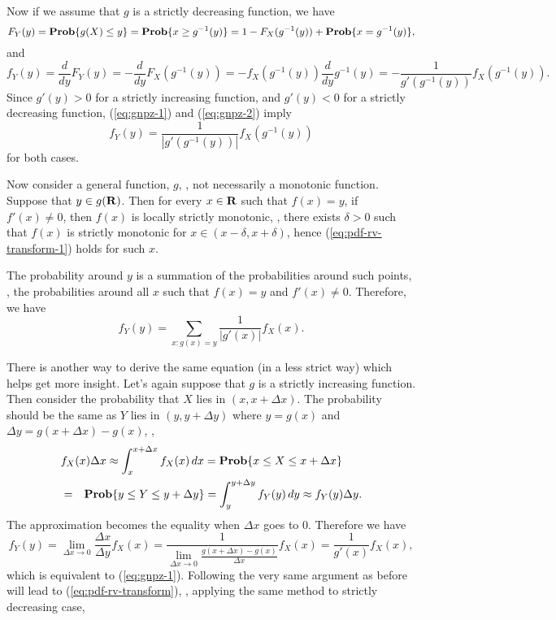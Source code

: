 Now if we assume that $g$ is a strictly decreasing function, we have
\[
    F_Y(y) = \mathop{\bf Prob}\{g(X) \leq y\}
    = \mathop{\bf Prob}\{x \geq g^{-1}(y)\}
    = 1 - F_X(g^{-1}(y))  + \mathop{\bf Prob}\{x = g^{-1}(y)\},
\]
and
\begin{equation}
\label{eq:gnpz-2}
    f_Y(y) = \frac{d}{dy} F_Y(y)
    = - \frac{d}{dy} F_X(g^{-1}(y))
    = - f_X(g^{-1}(y)) \frac{d}{dy} g^{-1}(y)
    = - \frac{1}{g'(g^{-1}(y))} f_X(g^{-1}(y)).
\end{equation}
Since $g'(y)>0$ for a strictly increasing function,
and $g'(y)<0$ for a strictly decreasing function,
(\ref{eq:gnpz-1}) and (\ref{eq:gnpz-2}) imply
\begin{equation}
\label{eq:pdf-rv-transform-1}
    f_Y(y) = \frac{1}{|g'(g^{-1}(y))|} f_X(g^{-1}(y))
\end{equation}
for both cases.

Now consider a general function, $g$, \ie, not necessarily a monotonic function.
Suppose that $y\in g(\mathbf{R})$.
Then for every $x\in\mathbf{R}$ such that $f(x) = y$,
if $f'(x)\neq0$, then $f(x)$ is locally strictly monotonic,
\ie, there exists $\delta>0$ such that $f(x)$ is strictly monotonic for $x\in(x-\delta, x + \delta)$,
hence (\ref{eq:pdf-rv-transform-1}) holds for such $x$.

The probability around $y$ is a summation of the probabilities around such points,
\ie, the probabilities around all $x$ such that $f(x) =y$ and $f'(x)\neq0$.
Therefore, we have
\begin{equation}
\label{eq:pdf-rv-transform}
    f_Y(y) = \sum_{x:g(x)=y}\frac{1}{|g'(x)|} f_X(x).
\end{equation}

There is another way to derive the same equation (in a less strict way)
which helps get more insight.
Let's again suppose that $g$ is a strictly increasing function.
Then consider the probability that $X$ lies in $(x, x + \Delta x)$.
The probability should be the same as $Y$ lies in $(y, y + \Delta y)$
where $y=g(x)$ and $\Delta y = g(x+\Delta x) - g(x)$,
\ie,
\begin{eqnarray*}
\lefteqn{
f_X(x) \Delta x
\approx
\int_{x}^{x + \Delta x} f_X(x) \, dx
=
\Prob\{x\leq X\leq x + \Delta x\}
}
\\
&=&
\Prob\{y\leq Y\leq y + \Delta y\}
=
\int_{y}^{y + \Delta y} f_Y(y) \, dy
\approx
f_Y(y) \Delta y.
\end{eqnarray*}
The approximation becomes the equality when $\Delta x$ goes to $0$.
Therefore we have
\begin{equation}
f_Y(y)
= \lim_{\Delta x \to 0}\frac{\Delta x}{\Delta y} f_X(x)
= \frac{1}{\lim_{\Delta x \to 0} \frac{g(x+\Delta x)-g(x)}{\Delta x}} f_X(x)
= \frac{1}{g'(x)} f_X(x),
\end{equation}
which is equivalent to (\ref{eq:gnpz-1}).
Following the very same argument as before will lead to (\ref{eq:pdf-rv-transform}),
\ie, applying the same method to strictly decreasing case, \etc\



